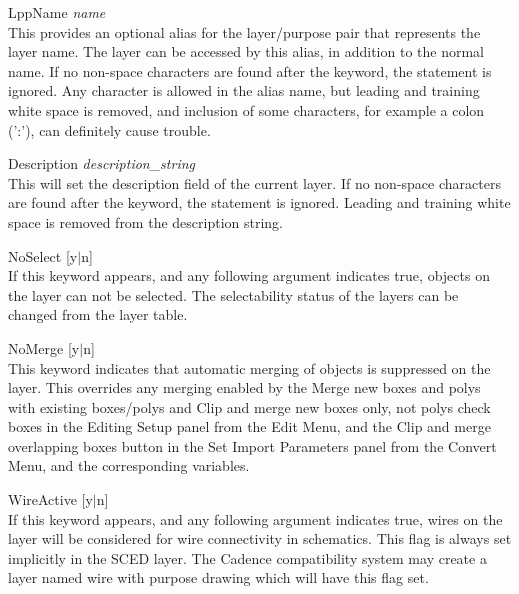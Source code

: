 \begin{description}
\item{\vt LppName} {\it name}\\
This provides an optional alias for the layer/purpose pair that
represents the {\Xic} layer name.  The {\Xic} layer can be accessed by
this alias, in addition to the normal name.  If no non-space
characters are found after the keyword, the statement is ignored.  Any
character is allowed in the alias name, but leading and training white
space is removed, and inclusion of some characters, for example a
colon ('{\vt :}'), can definitely cause trouble.

\item{\vt Description} {\it description\_string}\\
This will set the description field of the current layer.  If no
non-space characters are found after the keyword, the statement is
ignored.  Leading and training white space is removed from the
description string.

\item{\vt NoSelect} [{\vt y}$|${\vt n}]\\
If this keyword appears, and any following argument indicates true,
objects on the layer can not be selected.  The selectability status of
the layers can be changed from the layer table.

\item{\vt NoMerge} [{\vt y}$|${\vt n}]\\
This keyword indicates that automatic merging of objects is suppressed
on the layer.  This overrides any merging enabled by the {\cb Merge
new boxes and polys with existing boxes/polys} and {\cb Clip and merge
new boxes only, not polys} check boxes in the {\cb Editing Setup}
panel from the {\cb Edit Menu}, and the {\cb Clip and merge
overlapping boxes} button in the {\cb Set Import Parameters} panel
from the {\cb Convert Menu}, and the corresponding variables.

\item{\vt WireActive} [{\vt y}$|${\vt n}]\\
If this keyword appears, and any following argument indicates true,
wires on the layer will be considered for wire connectivity in
schematics.  This flag is always set implicitly in the {\vt SCED}
layer.  The Cadence compatibility system may create a layer named {\vt
wire} with purpose {\vt drawing} which will have this flag set.


\end{description}
